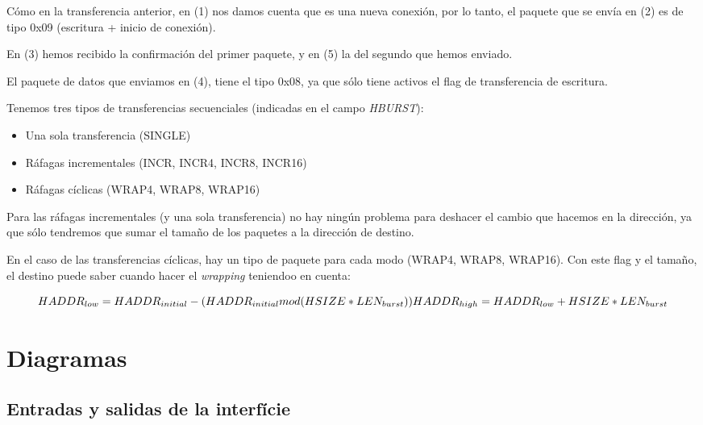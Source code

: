 \documentclass[a4paper, 12pt, babel, spanish]{article}
\begin{document}
Cómo en la transferencia anterior, en (1) nos damos cuenta que es una nueva conexión, por lo tanto, el paquete que se envía en (2) es de tipo 0x09 (escritura + inicio de conexión).

En (3) hemos recibido la confirmación del primer paquete, y en (5) la del segundo que hemos enviado.

El paquete de datos que enviamos en (4), tiene el tipo 0x08, ya que sólo tiene activos el flag de transferencia de escritura.

Tenemos tres tipos de transferencias secuenciales (indicadas en el campo \emph{HBURST}):

\begin{itemize}
\item Una sola transferencia (SINGLE)
\item Ráfagas incrementales (INCR, INCR4, INCR8, INCR16)
\item Ráfagas cíclicas (WRAP4, WRAP8, WRAP16)
\end{itemize}

Para las ráfagas incrementales (y una sola transferencia) no hay ningún problema para deshacer el cambio que hacemos en la dirección, ya que sólo tendremos que sumar el tamaño de los paquetes a la dirección de destino.

En el caso de las transferencias cíclicas, hay un tipo de paquete para cada modo (WRAP4, WRAP8, WRAP16). Con este flag y el tamaño, el destino puede saber cuando hacer el \emph{wrapping} teniendoo en cuenta:

\begin{displaymath}
HADDR_{low} \\ = HADDR_{initial} - ( HADDR_{initial} mod (HSIZE * LEN_{burst})) 
\newline
HADDR_{high} \\ = HADDR_{low} + HSIZE * LEN_{burst}
\end{displaymath}

\newpage

\section*{Diagramas}

\subsection*{Entradas y salidas de la interfície}
\end{document}
